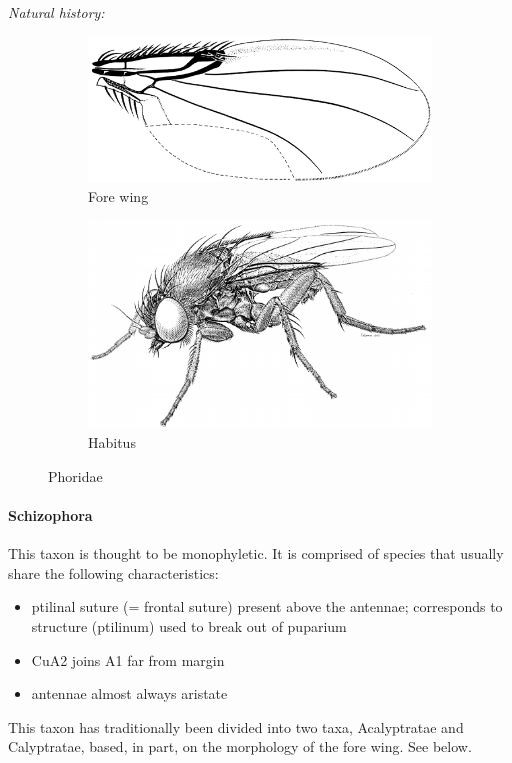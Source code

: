 \documentclass[letterpaper, 11pt]{article}
\begin{document}
\noindent{}\textit{Natural history:} \\

\begin{figure}[ht!]
    \centering
    \begin{subfigure}[ht!]{0.45\textwidth}
        \includegraphics[width=\textwidth]{PhoridWing}
        \caption{Fore wing \citep[][Fig. 51.44]{mcalpine1981manualv2}}
        \label{fig:phorid1}
    \end{subfigure}
    \qquad
    \begin{subfigure}[ht!]{0.45\textwidth}
        \includegraphics[width=\textwidth]{PhoridHabitus}
        \caption{Habitus \citep[][Fig. 51.1]{mcalpine1981manualv2}}
        \label{fig:phorid2}
    \end{subfigure}
    \caption{Phoridae}\label{fig:phorids}
\end{figure}

\paragraph{Schizophora} This taxon is thought to be monophyletic. It is comprised of species that usually share the following characteristics: 
\begin{itemize}
\item ptilinal suture (= frontal suture) present above the antennae; corresponds to structure (ptilinum) used to break out of puparium
\item CuA2 joins A1 far from margin
\item antennae almost always aristate
\end{itemize}
This taxon has traditionally been divided into two taxa, Acalyptratae and Calyptratae, based, in part, on the morphology of the fore wing. See below.
\end{document}
